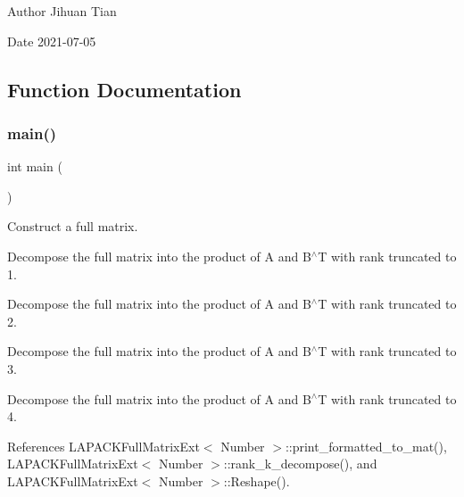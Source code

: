 \begin{DoxyAuthor}{Author}
Jihuan Tian 
\end{DoxyAuthor}
\begin{DoxyDate}{Date}
2021-\/07-\/05 
\end{DoxyDate}


\subsection{Function Documentation}
\mbox{\label{lapack-matrix-rk-decompose_8cc_ae66f6b31b5ad750f1fe042a706a4e3d4}} 
\subsubsection{\texorpdfstring{main()}{main()}}
{\footnotesize\ttfamily int main (\begin{DoxyParamCaption}{ }\end{DoxyParamCaption})}

Construct a full matrix.

Decompose the full matrix into the product of {\ttfamily A} and {\ttfamily B$^\wedge$T} with rank truncated to 1.

Decompose the full matrix into the product of {\ttfamily A} and {\ttfamily B$^\wedge$T} with rank truncated to 2.

Decompose the full matrix into the product of {\ttfamily A} and {\ttfamily B$^\wedge$T} with rank truncated to 3.

Decompose the full matrix into the product of {\ttfamily A} and {\ttfamily B$^\wedge$T} with rank truncated to 4.

References L\+A\+P\+A\+C\+K\+Full\+Matrix\+Ext$<$ Number $>$\+::print\+\_\+formatted\+\_\+to\+\_\+mat(), L\+A\+P\+A\+C\+K\+Full\+Matrix\+Ext$<$ Number $>$\+::rank\+\_\+k\+\_\+decompose(), and L\+A\+P\+A\+C\+K\+Full\+Matrix\+Ext$<$ Number $>$\+::\+Reshape().

